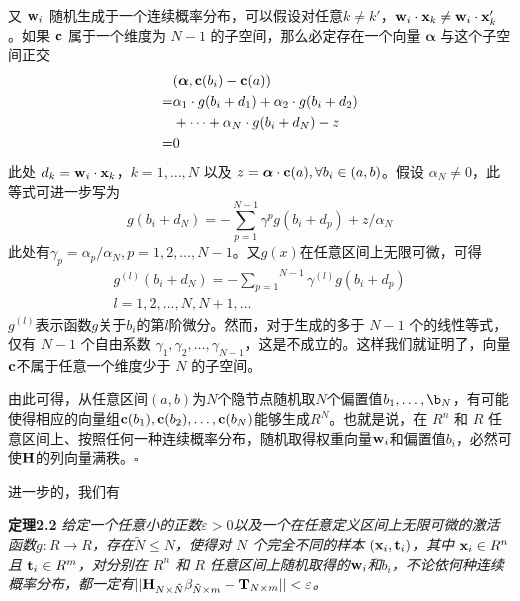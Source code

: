 \documentclass[conference]{IEEEtran}
\begin{document}
又 ${\bf w}_i$ 随机生成于一个连续概率分布，可以假设对任意$k\ne k'$，${\bf w}_i\cdot {\bf x}_k \ne {\bf w}_i\cdot {\bf x}_k'$。如果 ${\bf c}$ 属于一个维度为 $N-1$ 的子空间，那么必定存在一个向量 ${\bm \alpha}$ 与这个子空间正交
\begin{equation}\label{eq6}
	\begin{split}
		&({\bm \alpha},{\bf c}(b_i)-{\bf c}(a))\\
		=&{\alpha}_1\cdot g(b_i+d_1)+{\alpha}_2\cdot g(b_i+d_2)\\
		&+\dots+{\alpha}_N\cdot g(b_i+d_N)-z\\
		=&0
	\end{split}
\end{equation}
此处 $d_k={\bf w}_i\cdot{\bf x}_k$，$k=1,\dots,N$ 以及 $z={\bm \alpha}\cdot{\bf c}(a), \forall b_i\in(a,b)$。假设 $\alpha_N\ne0$，此等式可进一步写为
\begin{equation}\label{eq7}
	g(b_i+d_N)=-\overset{N-1} {\underset {p=1}\sum}\gamma^p g(b_i+d_p)+z/\alpha_N
\end{equation}
此处有$\gamma_p=\alpha_p/\alpha_N, p=1,2,\dots,N-1$。又$g(x)$在任意区间上无限可微，可得
\begin{equation}\label{eq8}
	\begin{split}
		g^{(l)}(b_i+d_N)=-\overset{N-1} {\underset {p=1}\sum}\gamma^{(l)} g(b_i+d_p)\\
		l=1,2,\dots,N,N+1,\dots
	\end{split}
\end{equation}
$g^{(l)}$表示函数$g$关于$b_i$的第$l$阶微分。然而，对于生成的多于 $N-1$ 个的线性等式，仅有 $N-1$ 个自由系数 $\gamma_1,\gamma_2,\dots,\gamma_{N-1}$，这是不成立的。这样我们就证明了，向量${\bf c}$不属于任意一个维度少于 $N$ 的子空间。

由此可得，从任意区间$(a,b)$为$N$个隐节点随机取$N$个偏置值$b_1,\dots,\b_N$，有可能使得相应的向量组${\bf c}(b_1),{\bf c}(b_2),\dots,{\bf c}(b_N)$能够生成$R^N$。也就是说，在 $R^n$ 和 $R$ 任意区间上、按照任何一种连续概率分布，随机取得权重向量${\bf w}_i$和偏置值$b_i$，必然可使${\bf H}$的列向量满秩。$\square$

进一步的，我们有

\textbf{定理2.2}\textit{
	给定一个任意小的正数$\varepsilon>0$以及一个在任意定义区间上无限可微的激活函数$g: R\rightarrow R$，存在${\tilde{N}\le N}$，使得对 $N$ 个完全不同的样本 $({\bf x}_i,{\bf t}_i )$，其中 ${\bf x}_i\in R^n$ 且 ${\bf t}_i\in R^m$，对分别在 $R^n$ 和 $R$ 任意区间上随机取得的${\bf w}_i$和$b_i$，不论依何种连续概率分布，都一定有$||{\bf H}_{N\times \tilde{N}}\beta_{\tilde{N}\times m}-{\bf T}_{N\times m}||<\varepsilon$。
}
\end{document}
